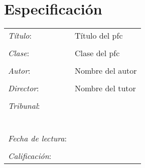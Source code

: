 \chapter*{Especificación}

\begin{tabular}{lp{9cm}}
\emph{Título}: & Título del pfc \\
& \\
\emph{Clase}: & Clase del pfc \\
& \\
\emph{Autor}: &  Nombre del autor \\
& \\
\emph{Director}: & Nombre del tutor \\
& \\
\emph{Tribunal}: & \\
& \\
& \\
& \\
& \\
& \\
& \\
\emph{Fecha de lectura}: & \\
& \\
\emph{Calificación}: & \\
\end{tabular}
